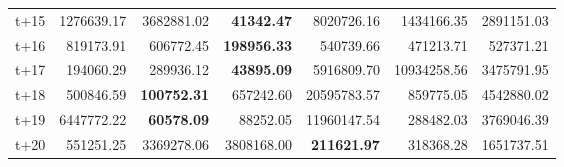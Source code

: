 \begin{table}[H]
\begin{tabular}{lrrrrrr}
t+15  & 1276639.17  & 3682881.02  & \textbf{41342.47}  & 8020726.16  & 1434166.35  & 2891151.03  \\
t+16  & 819173.91  & 606772.45  & \textbf{198956.33}  & 540739.66  & 471213.71  & 527371.21  \\
t+17  & 194060.29  & 289936.12  & \textbf{43895.09}  & 5916809.70  & 10934258.56  & 3475791.95  \\
t+18  & 500846.59  & \textbf{100752.31}  & 657242.60  & 20595783.57  & 859775.05  & 4542880.02  \\
t+19  & 6447772.22  & \textbf{60578.09}  & 88252.05  & 11960147.54  & 288482.03  & 3769046.39  \\
t+20  & 551251.25  & 3369278.06  & 3808168.00  & \textbf{211621.97}  & 318368.28  & 1651737.51  \\

\bottomrule
\end{tabular}
\end{table}
